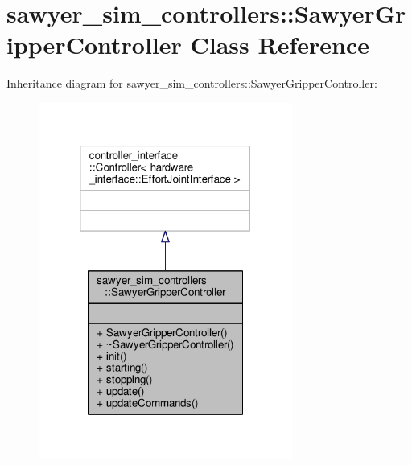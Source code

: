 \hypertarget{classsawyer__sim__controllers_1_1_sawyer_gripper_controller}{\section{sawyer\-\_\-sim\-\_\-controllers\-:\-:Sawyer\-Gripper\-Controller Class Reference}
\label{classsawyer__sim__controllers_1_1_sawyer_gripper_controller}
}


Inheritance diagram for sawyer\-\_\-sim\-\_\-controllers\-:\-:Sawyer\-Gripper\-Controller\-:
\nopagebreak
\begin{figure}[H]
\begin{center}
\leavevmode
\includegraphics[width=236pt]{classsawyer__sim__controllers_1_1_sawyer_gripper_controller__inherit__graph}
\end{center}
\end{figure}


